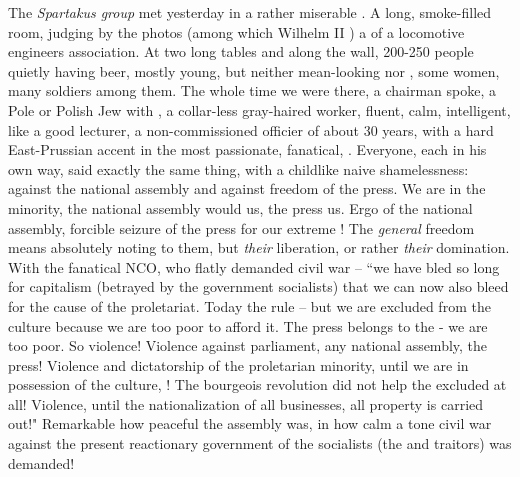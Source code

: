 The \textit{Spartakus group} met yesterday in a rather miserable . A long, smoke-filled room, judging by the photos (among which Wilhelm II ) a  of a locomotive engineers association. At two long tables and along the wall, 200-250 people quietly having beer, mostly young, but neither mean-looking nor , some women, many soldiers among them. The whole time we were there, a  chairman spoke, a  Pole or Polish Jew with , a collar-less gray-haired worker, fluent, calm, intelligent, like a good lecturer, a non-commissioned officier of about 30 years, with a hard East-Prussian accent in the most passionate, fanatical, . Everyone, each in his own way, said exactly the same thing, with a childlike naive shamelessness: against the national assembly and against freedom of the press. We are in the minority, the national assembly would  us, the press  us. Ergo  of the national assembly, forcible seizure of the press for our extreme ! The \textit{general} freedom means absolutely noting to them, but \textit{their} liberation, or rather \textit{their} domination. With the fanatical NCO, who flatly demanded civil war -- “we have bled so long for capitalism (betrayed by the government socialists) that we can now  also bleed for the cause of the proletariat. Today the  rule -- but we are excluded from the culture because we are too poor to afford it. The press belongs to the  - we are too poor. So violence! Violence against parliament, any national assembly, the press! Violence and dictatorship of the proletarian minority, until we are in possession of the culture, ! The bourgeois revolution did not help the excluded at all! Violence, until the nationalization of all businesses, all property is carried out!" Remarkable how peaceful the assembly was, in how calm a tone civil war against the present reactionary government of the socialists (the  and traitors) was demanded!

